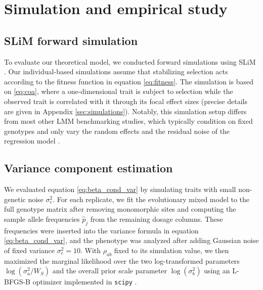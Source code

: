 \documentclass[10pt]{article}
\begin{document}
\section{Simulation and empirical study}

\subsection{SLiM forward simulation}
To evaluate our theoretical model, we conducted forward simulations using SLiM \citep{Haller_2025}. Our individual-based simulations assume that stabilizing selection acts according to the fitness function in equation \eqref{eq:fitness}.
The simulation is based on \eqref{eq:coa}, where a one-dimensional trait is subject to selection while the observed trait is correlated with it through its focal effect sizes (precise details are given in Appendix \ref{sec:simulations}).
Notably, this simulation setup differs from most other LMM benchmarking studies, which typically condition on fixed genotypes and only vary the random effects and the residual noise of the regression model \citep{Speed2017, Gazal_2019, Priv__2020}.


\subsection{Variance component estimation}

We evaluated equation \eqref{eq:beta_cond_var} by simulating traits with small non-genetic noise $\sigma_e^2$.
For each replicate, we fit the evolutionary mixed model to the full genotype matrix after removing monomorphic sites and computing the sample allele frequencies $\hat p_j$ from the remaining dosage columns. These frequencies were inserted into the variance formula in equation \eqref{eq:beta_cond_var}, and the phenotype was analyzed after adding Gaussian noise of fixed variance $\sigma_e^2=10$. With $\rho_{ab}$ fixed to its simulation value, we then maximized the marginal likelihood over the two log-transformed parameters $\log(\sigma_a^2/W_S)$ and the overall prior scale parameter $\log(\sigma_b^2)$ using an L-BFGS-B optimizer implemented in \texttt{scipy} \citep{Virtanen2020}.
\end{document}
